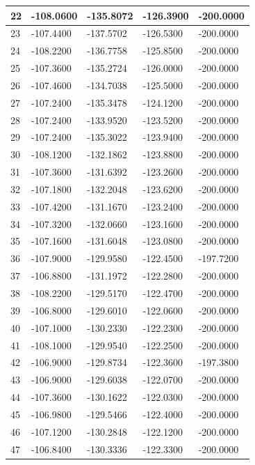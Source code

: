 \begin{longtable}{|l|l|l|l|l|}
22 & -108.0600 & -135.8072 & -126.3900 & -200.0000 \\\hline
23 & -107.4400 & -137.5702 & -126.5300 & -200.0000 \\\hline
24 & -108.2200 & -136.7758 & -125.8500 & -200.0000 \\\hline
25 & -107.3600 & -135.2724 & -126.0000 & -200.0000 \\\hline
26 & -107.4600 & -134.7038 & -125.5000 & -200.0000 \\\hline
27 & -107.2400 & -135.3478 & -124.1200 & -200.0000 \\\hline
28 & -107.2400 & -133.9520 & -123.5200 & -200.0000 \\\hline
29 & -107.2400 & -135.3022 & -123.9400 & -200.0000 \\\hline
30 & -108.1200 & -132.1862 & -123.8800 & -200.0000 \\\hline
31 & -107.3600 & -131.6392 & -123.2600 & -200.0000 \\\hline
32 & -107.1800 & -132.2048 & -123.6200 & -200.0000 \\\hline
33 & -107.4200 & -131.1670 & -123.2400 & -200.0000 \\\hline
34 & -107.3200 & -132.0660 & -123.1600 & -200.0000 \\\hline
35 & -107.1600 & -131.6048 & -123.0800 & -200.0000 \\\hline
36 & -107.9000 & -129.9580 & -122.4500 & -197.7200 \\\hline
37 & -106.8800 & -131.1972 & -122.2800 & -200.0000 \\\hline
38 & -108.2200 & -129.5170 & -122.4700 & -200.0000 \\\hline
39 & -106.8000 & -129.6010 & -122.0600 & -200.0000 \\\hline
40 & -107.1000 & -130.2330 & -122.2300 & -200.0000 \\\hline
41 & -108.1000 & -129.9540 & -122.2500 & -200.0000 \\\hline
42 & -106.9000 & -129.8734 & -122.3600 & -197.3800 \\\hline
43 & -106.9000 & -129.6038 & -122.0700 & -200.0000 \\\hline
44 & -107.3600 & -130.1622 & -122.0300 & -200.0000 \\\hline
45 & -106.9800 & -129.5466 & -122.4000 & -200.0000 \\\hline
46 & -107.1200 & -130.2848 & -122.1200 & -200.0000 \\\hline
47 & -106.8400 & -130.3336 & -122.3300 & -200.0000 \\\hline

\end{longtable}
